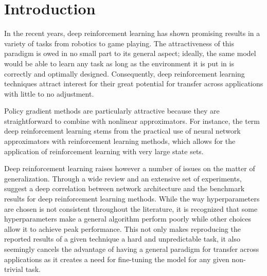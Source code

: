 \section{Introduction}
\label{sec:intro}

In the recent years, deep reinforcement learning has shown promising results in a variety of tasks from robotics to game playing. The attractiveness of this paradigm is owed in no small part to its general aspect; ideally, the same model would be able to learn any task as long as the environment it is put in is correctly and optimally designed. Consequently, deep reinforcement learning techniques attract interest for their great potential for transfer across applications with little to no adjustment.

Policy gradient methods are particularly attractive because they are straightforward to combine with nonlinear approximators. For instance, the term deep reinforcement learning stems from the practical use of neural network approximators with reinforcement learning methods, which allows for the application of reinforcement learning with very large state sets. 

Deep reinforcement learning raises however a number of issues on the matter of generalization. Through a wide review and an extensive set of experiments, \cite{henderson2018deep} suggest a deep correlation between network architecture and the benchmark results for deep reinforcement learning methods. While the way hyperparameters are chosen is not consistent throughout the literature, it is recognized that some hyperparameters make a general algorithm perform poorly while other choices allow it to achieve peak performance. This not only makes reproducing the reported results of a given technique a hard and unpredictable task, it also seemingly cancels the advantage of having a general paradigm for transfer across applications as it creates a need for fine-tuning the model for any given non-trivial task.


